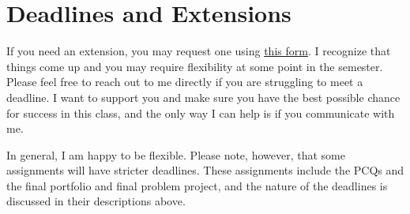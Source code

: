 \documentclass[
  letterpaper,
  DIV=11,
  numbers=noendperiod]{scrartcl}
\begin{document}
\section{Deadlines and Extensions}\label{deadlines}

If you need an extension, you may request one using
\href{https://forms.gle/eFx7y7FoSdoukKGC6}{this form}. I recognize that
things come up and you may require flexibility at some point in the
semester. Please feel free to reach out to me directly if you are
struggling to meet a deadline. I want to support you and make sure you
have the best possible chance for success in this class, and the only
way I can help is if you communicate with me.

In general, I am happy to be flexible. Please note, however, that some
assignments will have stricter deadlines. These assignments include the
PCQs and the final portfolio and final problem project, and the nature
of the deadlines is discussed in their descriptions above.
\end{document}
